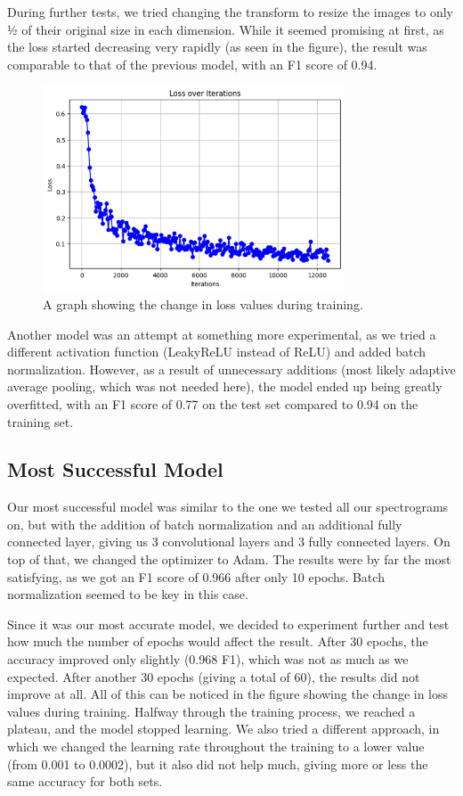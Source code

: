 \documentclass[11pt, letterpaper]{article}
\begin{document}
During further tests, we tried changing the transform to resize the images to only ½ of their original size in each dimension. While it seemed promising at first, as the loss started decreasing very rapidly (as seen in the figure), the result was comparable to that of the previous model, with an F1 score of 0.94.

\begin{figure}[H]
    \centering
    \includegraphics[width=0.8\textwidth]{lossplot1.png}
    \caption{A graph showing the change in loss values during training.}
\end{figure}

Another model was an attempt at something more experimental, as we tried a different activation function (LeakyReLU instead of ReLU) and added batch normalization. However, as a result of unnecessary additions (most likely adaptive average pooling, which was not needed here), the model ended up being greatly overfitted, with an F1 score of 0.77 on the test set compared to 0.94 on the training set.

\subsection{Most Successful Model}

Our most successful model was similar to the one we tested all our spectrograms on, but with the addition of batch normalization and an additional fully connected layer, giving us 3 convolutional layers and 3 fully connected layers. On top of that, we changed the optimizer to Adam. The results were by far the most satisfying, as we got an F1 score of 0.966 after only 10 epochs. Batch normalization seemed to be key in this case.

Since it was our most accurate model, we decided to experiment further and test how much the number of epochs would affect the result. After 30 epochs, the accuracy improved only slightly (0.968 F1), which was not as much as we expected. After another 30 epochs (giving a total of 60), the results did not improve at all. All of this can be noticed in the figure showing the change in loss values during training. Halfway through the training process, we reached a plateau, and the model stopped learning. We also tried a different approach, in which we changed the learning rate throughout the training to a lower value (from 0.001 to 0.0002), but it also did not help much, giving more or less the same accuracy for both sets.
\end{document}
